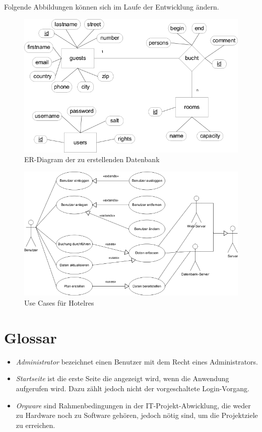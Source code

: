\documentclass[a4paper,oneside]{scrreprt}
\begin{document}
Folgende Abbildungen können sich im Laufe der Entwicklung ändern.

\hspace{2.5 cm} %

\begin{figure}[hf]
\centering
\includegraphics[width=\textwidth]{er-chart.png}
\caption{ER-Diagram der zu erstellenden Datenbank}
\label{entity-relationship}
\end{figure}

\begin{figure}[hf]
\centering
\includegraphics[width=\textwidth]{use-cases.png}
\caption{Use Cases für Hotelres}
\label{use-cases}
\end{figure}



\chapter{Glossar}

\begin{itemize}
\item \emph{Administrator} bezeichnet einen Benutzer mit dem Recht eines Administrators.

\item \emph{Startseite} ist die erste Seite die angezeigt wird, wenn die Anwendung aufgerufen wird. Dazu zählt jedoch nicht der vorgeschaltete Login-Vorgang.

\item \emph{Orgware} sind Rahmenbedingungen in der IT-Projekt-Abwicklung, die weder zu Hardware noch zu Software gehören, jedoch nötig sind, um die Projektziele zu erreichen.
\end{itemize}
\end{document}
